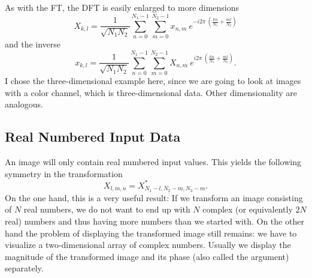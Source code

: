 As with the FT, the DFT is easily enlarged to more dimensions
\begin{equation}
    X_{k,l} = \frac{1}{\sqrt{N_1N_2}}\sum_{n=0}^{N_1-1}\sum_{m=0}^{N_2-1}x_{n,m} \ e^{-i{2\pi}\ \left(\!\frac{kn}{N_1}+\frac{ml}{N_2}\right)}
    \label{eqn:dft2d}
\end{equation}
and the inverse
\begin{equation}
    x_{k,l} = \frac{1}{\sqrt{N_1N_2}}\sum_{n=0}^{N_1-1}\sum_{m=0}^{N_2-1} X_{n,m} \ e^{i{2\pi}\ \left(\!\frac{kn}{N_1}+\frac{ml}{N_2}\right)}.
    \label{eqn:idft2d}
\end{equation}
I chose the three-dimensional example here, since we are going to look at images with a color channel, which is three-dimensional data.
Other dimensionality are analogous.

\subsection{Real Numbered Input Data}
An image will only contain real numbered input values. This yields the following symmetry in the transformation
\begin{equation}
    X_{l,m,n} = X^*_{N_1-l,N_2-m,N_3-m}.
    \label{eqn:realFSymmetry}
\end{equation}
On the one hand, this is a very useful result: If we transform an image consisting of $N$ real numbers,
we do not want to end up with $N$ complex (or equivalently $2N$ real) numbers and thus having more numbers than we started with.
On the other hand the problem of displaying the transformed image still remains: we have to visualize a two-dimensional array of complex numbers.
Usually we display the magnitude of the transformed image and its phase (also called the argument) separately.

